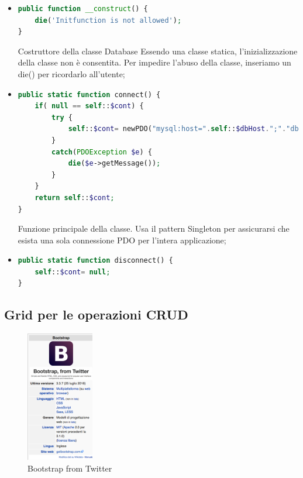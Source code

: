 \begin{itemize}

\item{}

\begin{lstlisting}[language=PHP]
public function __construct() {
	die('Initfunction is not allowed');
}
\end{lstlisting}

Costruttore della classe Database Essendo una classe statica, l’inizializzazione della classe non è consentita. Per impedire l’abuso della classe, inseriamo un die() per ricordarlo all’utente;

\item{}

\begin{lstlisting}[language=PHP]
public static function connect() {
	if( null == self::$cont) {
		try {
			self::$cont= newPDO("mysql:host=".self::$dbHost.";"."dbname=".self::$dbName,  self::$dbUsername, self::$dbUserPassword);
		} 
		catch(PDOException $e) {
			die($e->getMessage());
		} 
	} 
	return self::$cont; 
} 
\end{lstlisting}

Funzione principale della classe. Usa il pattern Singleton per assicurarsi che esista una sola connessione PDO per l’intera applicazione;

\item{}

\begin{lstlisting}[language=PHP]
public static function disconnect() {
	self::$cont= null; 
}
\end{lstlisting}

\end{itemize}


\subsection{Grid per le operazioni CRUD}


\begin{center}
\begin{figure}[H]
\centering
\includegraphics[scale=1]{figures/bootstrap.png}
\caption{Bootstrap from Twitter} 
\end{figure}
\end{center}

